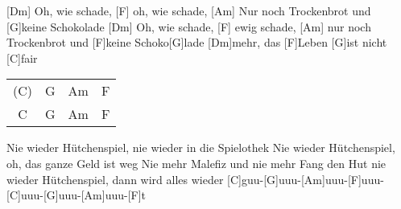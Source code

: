 \begin{guitar}
	[Dm] Oh, wie schade, [F] oh, wie schade,
	[Am] Nur noch Trockenbrot und [G]keine Schokolade
	[Dm] Oh, wie schade, [F] ewig schade,
	[Am] nur noch Trockenbrot und [F]keine Schoko[G]lade [Dm]mehr,
	das [F]Leben [G]ist nicht [C]fair
	
	{\footnotesize\begin{tabular}{|c|c|c|c|}
			(C) & G & Am & F\\
			C & G & Am & F
	\end{tabular}}
	
	\begin{highlightbar}
		Nie wieder Hütchenspiel, nie wieder in die Spielothek
		Nie wieder Hütchenspiel, oh, das ganze Geld ist weg
		Nie mehr Malefiz und nie mehr Fang den Hut
		nie wieder Hütchenspiel, dann wird alles wieder
		[C]guu-[G]uuu-[Am]uuu-[F]uuu-[C]uuu-[G]uuu-[Am]uuu-[F]t
	\end{highlightbar}
	
	\vspace{-1em}
\end{guitar}

